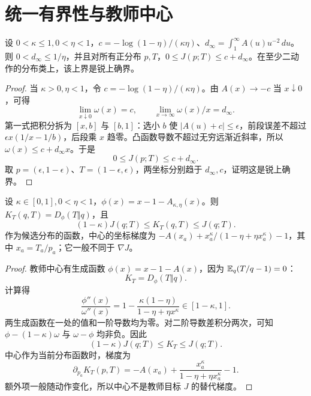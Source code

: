 \section{统一有界性与教师中心}
\begin{theorem}[教师目标的锐统一上界]
设 $0<\kappa\le1,0<\eta<1$，$c=-\log(1-\eta)/(\kappa\eta)$、$d_\infty=\int_1^\infty A(u)u^{-2}\,du$。则 $0<d_\infty\le1/\eta$，并且对所有正分布 $p,T$，$0\le J(p;T)\le c+d_\infty$。在至少二动作的分布类上，该上界是锐上确界。
\end{theorem}
\begin{proof}
当 $\kappa>0,\eta<1$，令 $c=-\log(1-\eta)/(\kappa\eta)$。由 $A(x)\to-c$ 当 $x\downarrow0$，可得
\begin{equation}
\lim_{x\downarrow0}\omega(x)=c,\qquad
\lim_{x\to\infty}\omega(x)/x=d_\infty.
\end{equation}
第一式把积分拆为 $[x,b]$ 与 $[b,1]$：选小 $b$ 使 $|A(u)+c|\le\epsilon$，前段误差不超过 $\epsilon x(1/x-1/b)$，后段乘 $x$ 趋零。凸函数导数不超过无穷远渐近斜率，所以 $\omega(x)\le c+d_\infty x$。于是
\begin{equation}
0\le J(p;T)\le c+d_\infty.
\end{equation}
取 $p=(\epsilon,1-\epsilon)$、$T=(1-\epsilon,\epsilon)$，两坐标分别趋于 $d_\infty,c$，证明这是锐上确界。
\end{proof}

\begin{proposition}[教师中心与教师目标的比较]
设 $\kappa\in[0,1],0<\eta<1$，$\phi(x)=x-1-A_{\kappa,\eta}(x)$。则 $K_T(q,T)=D_\phi(T\Vert q)$，且
\begin{equation}
(1-\kappa)J(q;T)\le K_T(q,T)\le J(q;T).
\end{equation}
作为候选分布的函数，中心的坐标梯度为 $-A(x_a)+x_a^\kappa/(1-\eta+\eta x_a^\kappa)-1$，其中 $x_a=T_a/p_a$；它一般不同于 $\nabla J$。
\end{proposition}
\begin{proof}
教师中心有生成函数 $\phi(x)=x-1-A(x)$，因为 $\mathbb E_q(T/q-1)=0$：
\begin{equation}
K_T=D_\phi(T\Vert q).
\end{equation}
计算得
\begin{equation}
\frac{\phi''(x)}{\omega''(x)}
=1-\frac{\kappa(1-\eta)}{1-\eta+\eta x^\kappa}\in[1-\kappa,1].
\end{equation}
两生成函数在一处的值和一阶导数均为零。对二阶导数差积分两次，可知 $\phi-(1-\kappa)\omega$ 与 $\omega-\phi$ 均非负。因此
\begin{equation}
(1-\kappa)J(q;T)\le K_T\le J(q;T).
\label{eq:center-sandwich}
\end{equation}
中心作为当前分布函数时，梯度为
\begin{equation}
\partial_{p_a}K_T(p,T)
=-A(x_a)+\frac{x_a^\kappa}{1-\eta+\eta x_a^\kappa}-1.
\end{equation}
额外项一般随动作变化，所以中心不是教师目标 $J$ 的替代梯度。
\end{proof}

